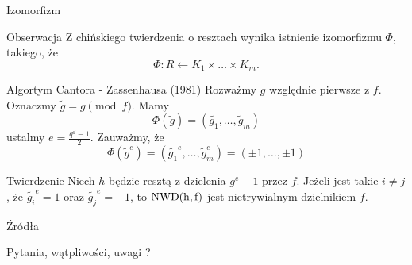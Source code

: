 \documentclass{beamer}
\newcommand{\NWD}{\rm{NWD}}
\begin{document}
\begin{frame}{Izomorfizm}
    \begin{alertblock}{Obserwacja}
    Z chińskiego twierdzenia o resztach wynika istnienie izomorfizmu $\Phi$, takiego, że
    $$ \Phi : R \leftarrow K_1 \times \ldots \times K_m.$$        
    \end{alertblock}
\end{frame}

\begin{frame}{Algortym Cantora - Zassenhausa (1981)}
    Rozważmy $g$ względnie pierwsze z $f$. Oznaczmy $\tilde{g} = g \pmod{f}$.
    Mamy $$ \Phi(\tilde{g}) = (\tilde{g_1}, \ldots, \tilde{g}_m)$$
    ustalmy $e = \frac{q^d - 1}{2}$. Zauważmy, że 
    $$ \Phi(\tilde{g}^e) = (\tilde{g_1}^e, \ldots, \tilde{g}_m^e) = (\pm 1, \ldots , \pm 1)$$
    \pause 
    \begin{block}{Twierdzenie}
        Niech $h$ będzie resztą z dzielenia $g^e -1$ przez $f$. Jeżeli jest takie $i \neq j$,
        że $\tilde{g_i}^e =1$ oraz $\tilde{g_j}^e = -1$, to $\NWD(h,f)$ jest nietrywialnym dzielnikiem $f$.  
    \end{block}
\end{frame}

\begin{frame}{Źródła}

\printbibliography
\end{frame}

\begin{frame}
    \centering 
    \LARGE Pytania, wątpliwości, uwagi ? 
\end{frame}
\end{document}
